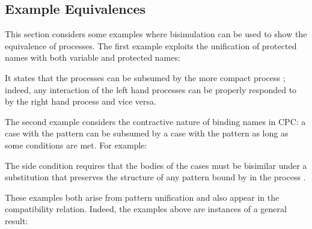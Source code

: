 \documentclass{LMCS}
\begin{document}
\subsection{Example Equivalences}
\label{subsec:examples}

This section considers some examples where bisimulation can be used to show the equivalence of processes.
The first example exploits the unification of protected names with both variable and protected names:

It states that the processes  can be subsumed by the more compact process ;
indeed, any interaction of the left hand processes can be properly responded to by the right hand process and vice versa.

The second example considers the contractive nature of binding names in CPC:
a case with the pattern  can be subsumed by a case with the pattern  as long as some conditions are met.
For example:

The side condition requires that the bodies of the cases must be bisimilar under a substitution that preserves the structure of any pattern bound by  in the process .

These examples both arise from pattern unification and also appear in the compatibility relation.
Indeed, the examples above are instances of a general result:
\end{document}
